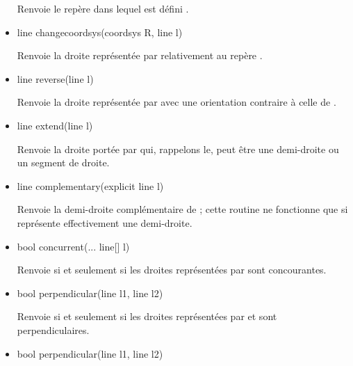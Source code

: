 \documentclass[pdftex]{article}
\newcommand{\ssi}{si et seulement si\xspace}
\begin{document}
\begin{itemize}
  Renvoie le repère dans lequel est défini .
\item {}%
    \begin{Vcolor}
    line changecoordsys(coordsys R, line l)
  \end{Vcolor}
  Renvoie la \og{}droite\fg{} représentée par  relativement au
  repère .
\item {}%
    \begin{Vcolor}
    line reverse(line l)
  \end{Vcolor}
  Renvoie la droite représentée par  avec une orientation
  contraire à celle de .
\item {}%
    \begin{Vcolor}
    line extend(line l)
  \end{Vcolor}
  Renvoie la droite portée par  qui, rappelons le, peut
  être une demi-droite ou un segment de droite.
\item {}%
    \begin{Vcolor}
    line complementary(explicit line l)
  \end{Vcolor}
  Renvoie la demi-droite complémentaire de ; cette routine ne
  fonctionne que si  représente effectivement une demi-droite.
\item {}%
    \begin{Vcolor}
    bool concurrent(... line[] l)
  \end{Vcolor}
  Renvoie  \ssi les droites représentées par
   sont concourantes.
\item {}%
    \begin{Vcolor}
    bool perpendicular(line l1, line l2)
  \end{Vcolor}
  Renvoie  \ssi les droites représentées par
   et  sont perpendiculaires.
\item {}%
    \begin{Vcolor}
    bool perpendicular(line l1, line l2)
  \end{Vcolor}
\end{itemize}
\end{document}
